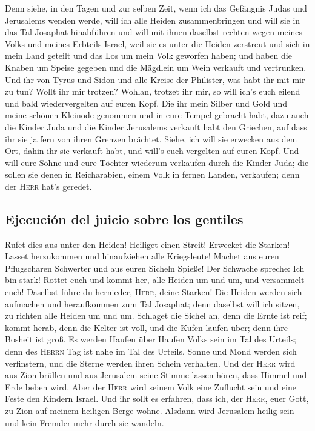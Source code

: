  Denn siehe, in den Tagen und zur selben Zeit, wenn ich
das Gefängnis Judas und Jerusalems wenden werde,  will ich
alle Heiden zusammenbringen und will sie in das Tal Josaphat hinabführen
und will mit ihnen daselbst rechten wegen meines Volks und meines
Erbteils Israel, weil sie es unter die Heiden zerstreut und sich in mein
Land geteilt  und das Los um mein Volk geworfen haben; und
haben die Knaben um Speise gegeben und die Mägdlein um Wein verkauft und
vertrunken.  Und ihr von Tyrus und Sidon und alle Kreise
der Philister, was habt ihr mit mir zu tun? Wollt ihr mir trotzen?
Wohlan, trotzet ihr mir, so will ich's euch eilend und bald
wiedervergelten auf euren Kopf.  Die ihr mein Silber und
Gold und meine schönen Kleinode genommen und in eure Tempel gebracht
habt,  dazu auch die Kinder Juda und die Kinder Jerusalems
verkauft habt den Griechen, auf dass ihr sie ja fern von ihren Grenzen
brächtet.  Siehe, ich will sie erwecken aus dem Ort, dahin
ihr sie verkauft habt, und will's euch vergelten auf euren Kopf.
 Und will eure Söhne und eure Töchter wiederum verkaufen
durch die Kinder Juda; die sollen sie denen in Reicharabien, einem Volk
in fernen Landen, verkaufen; denn der \textsc{Herr} hat's geredet.

\hypertarget{ejecuciuxf3n-del-juicio-sobre-los-gentiles}{%
\subsection{Ejecución del juicio sobre los
gentiles}\label{ejecuciuxf3n-del-juicio-sobre-los-gentiles}}

 Rufet dies aus unter den Heiden! Heiliget einen Streit!
Erwecket die Starken! Lasset herzukommen und hinaufziehen alle
Kriegsleute!  Machet aus euren Pflugscharen Schwerter und
aus euren Sicheln Spieße! Der Schwache spreche: Ich bin stark!
 Rottet euch und kommt her, alle Heiden um und um, und
versammelt euch! Daselbst führe du hernieder, \textsc{Herr}, deine
Starken!  Die Heiden werden sich aufmachen und
heraufkommen zum Tal Josaphat; denn daselbst will ich sitzen, zu richten
alle Heiden um und um.  Schlaget die Sichel an, denn die
Ernte ist reif; kommt herab, denn die Kelter ist voll, und die Kufen
laufen über; denn ihre Bosheit ist groß.  Es werden
Haufen über Haufen Volks sein im Tal des Urteils; denn des
\textsc{Herrn} Tag ist nahe im Tal des Urteils.  Sonne
und Mond werden sich verfinstern, und die Sterne werden ihren Schein
verhalten.  Und der \textsc{Herr} wird aus Zion brüllen
und aus Jerusalem seine Stimme lassen hören, dass Himmel und Erde beben
wird. Aber der \textsc{Herr} wird seinem Volk eine Zuflucht sein und
eine Feste den Kindern Israel.  Und ihr sollt es
erfahren, dass ich, der \textsc{Herr}, euer Gott, zu Zion auf meinem
heiligen Berge wohne. Alsdann wird Jerusalem heilig sein und kein
Fremder mehr durch sie wandeln.

